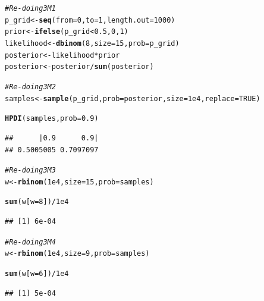 \documentclass[12pt]{article}\usepackage[]{graphicx}\usepackage[]{color}
\makeatletter
\newcommand{\hlnum}[1]{\textcolor[rgb]{0.686,0.059,0.569}{#1}}%
\newcommand{\hlcom}[1]{\textcolor[rgb]{0.678,0.584,0.686}{\textit{#1}}}%
\newcommand{\hlopt}[1]{\textcolor[rgb]{0,0,0}{#1}}%
\newcommand{\hlstd}[1]{\textcolor[rgb]{0.345,0.345,0.345}{#1}}%
\newcommand{\hlkwb}[1]{\textcolor[rgb]{0.69,0.353,0.396}{#1}}%
\newcommand{\hlkwc}[1]{\textcolor[rgb]{0.333,0.667,0.333}{#1}}%
\newcommand{\hlkwd}[1]{\textcolor[rgb]{0.737,0.353,0.396}{\textbf{#1}}}%
\newenvironment{kframe}{%
 \def\at@end@of@kframe{}%
 \ifinner\ifhmode%
  \def\at@end@of@kframe{\end{minipage}}%
  \begin{minipage}{\columnwidth}%
 \fi\fi%
 \def\FrameCommand##1{\hskip\@totalleftmargin \hskip-\fboxsep
 \colorbox{shadecolor}{##1}\hskip-\fboxsep
     \hskip-\linewidth \hskip-\@totalleftmargin \hskip\columnwidth}%
 \MakeFramed {\advance\hsize-\width
   \@totalleftmargin\z@ \linewidth\hsize
   \@setminipage}}%
 {\par\unskip\endMakeFramed%
 \at@end@of@kframe}
\newenvironment{knitrout}{}{} %
\makeatother
\begin{document}
\begin{knitrout}
\color{fgcolor}\begin{kframe}
\begin{alltt}
\hlcom{#Re-doing 3M1}
\hlstd{p_grid} \hlkwb{<-} \hlkwd{seq}\hlstd{(}\hlkwc{from} \hlstd{=} \hlnum{0}\hlstd{,} \hlkwc{to} \hlstd{=} \hlnum{1}\hlstd{,} \hlkwc{length.out} \hlstd{=} \hlnum{1000}\hlstd{)}
\hlstd{prior} \hlkwb{<-} \hlkwd{ifelse}\hlstd{(p_grid} \hlopt{<} \hlnum{0.5}\hlstd{,} \hlnum{0}\hlstd{,} \hlnum{1}\hlstd{)}
\hlstd{likelihood} \hlkwb{<-} \hlkwd{dbinom}\hlstd{(}\hlnum{8}\hlstd{,} \hlkwc{size} \hlstd{=} \hlnum{15}\hlstd{,} \hlkwc{prob} \hlstd{= p_grid)}
\hlstd{posterior} \hlkwb{<-} \hlstd{likelihood}\hlopt{*}\hlstd{prior}
\hlstd{posterior} \hlkwb{<-} \hlstd{posterior} \hlopt{/} \hlkwd{sum}\hlstd{(posterior)}

\hlcom{#Re-doing 3M2}
\hlstd{samples} \hlkwb{<-} \hlkwd{sample}\hlstd{(p_grid,} \hlkwc{prob} \hlstd{= posterior,} \hlkwc{size} \hlstd{=} \hlnum{1e4}\hlstd{,} \hlkwc{replace} \hlstd{=} \hlnum{TRUE}\hlstd{)}

\hlkwd{HPDI}\hlstd{(samples,} \hlkwc{prob} \hlstd{=} \hlnum{0.9}\hlstd{)}
\end{alltt}
\begin{verbatim}
##      |0.9      0.9| 
## 0.5005005 0.7097097
\end{verbatim}
\begin{alltt}
\hlcom{#Re-doing 3M3}
\hlstd{w} \hlkwb{<-} \hlkwd{rbinom}\hlstd{(}\hlnum{1e4}\hlstd{,} \hlkwc{size} \hlstd{=} \hlnum{15}\hlstd{,} \hlkwc{prob} \hlstd{= samples)}

\hlkwd{sum}\hlstd{(w[}\hlkwc{w} \hlstd{=} \hlnum{8}\hlstd{])} \hlopt{/} \hlnum{1e4}
\end{alltt}
\begin{verbatim}
## [1] 6e-04
\end{verbatim}
\begin{alltt}
\hlcom{#Re-doing 3M4}
\hlstd{w} \hlkwb{<-} \hlkwd{rbinom}\hlstd{(}\hlnum{1e4}\hlstd{,} \hlkwc{size} \hlstd{=} \hlnum{9}\hlstd{,} \hlkwc{prob} \hlstd{= samples)}

\hlkwd{sum}\hlstd{(w[}\hlkwc{w} \hlstd{=} \hlnum{6}\hlstd{])} \hlopt{/} \hlnum{1e4}
\end{alltt}
\begin{verbatim}
## [1] 5e-04
\end{verbatim}
\end{kframe}
\end{knitrout}
\end{document}
